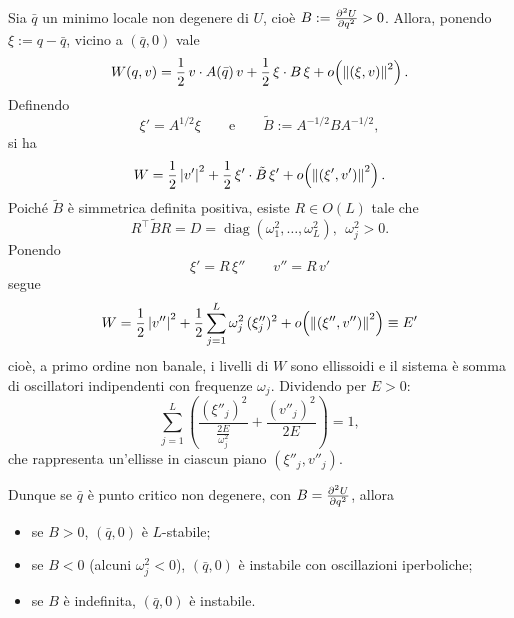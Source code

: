\begin{proposition}
Sia $\bar{q}$ un minimo locale non degenere di $U$, cioè $B:=\pdv[2]{U}{q}(\bar{q})>0$. Allora, ponendo $\xi:=q-\bar{q}$, vicino a $(\bar{q},0)$ vale
\begin{equation}
    W(q,v)=\frac{1}{2}\,v\cdot A(\bar{q})\,v+\frac{1}{2}\,\xi\cdot B\,\xi+o\!\left(\norm{(\xi,v)}^2\right).
\end{equation}
Definendo
\begin{equation}
    \xi'=A^{1/2}\xi \qquad\text{e}\qquad \tilde{B}:=A^{-1/2}BA^{-1/2},
\end{equation}
si ha
\begin{equation}
    W=\frac{1}{2}\,\abs{v'}^2+\frac{1}{2}\,\xi'\cdot \tilde{B}\,\xi'+o\!\left(\norm{(\xi',v')}^2\right).
\end{equation}
Poiché $\tilde{B}$ è simmetrica definita positiva, esiste $R\in O(L)$ tale che
\begin{equation}
    R^\intercal \tilde{B} R=D=\operatorname{diag}(\omega_1^2,\dots,\omega_L^2),\ \ \omega_j^2>0.
\end{equation}
Ponendo
\begin{equation}
    \xi'=R\,\xi'' \qquad v''=R\,v'
\end{equation}
segue
\begin{equation}
    W=\frac{1}{2}\,\abs{v''}^2+\frac{1}{2}\sum_{j=1}^{L}\omega_j^2\,(\xi''_j)^2+o\!\left(\norm{(\xi'',v'')}^2\right)\equiv E'
\end{equation}
cioè, a primo ordine non banale, i livelli di $W$ sono ellissoidi e il sistema è somma di oscillatori indipendenti con frequenze $\omega_j$.
Dividendo per $E>0$:
\begin{equation}
    \sum_{j=1}^{L}\left( \frac{(\xi''_j)^2}{\tfrac{2E}{\omega_j^2}} + \frac{(v''_j)^2}{2E} \right)=1,
\end{equation}
che rappresenta un’ellisse in ciascun piano $(\xi''_j,v''_j)$.


Dunque se $\bar{q}$ è punto critico non degenere, con $B=\pdv[2]{U}{q}(\bar{q})$, allora
\begin{itemize}
    \item se $B>0$, $(\bar{q},0)$ è $L$-stabile;
    \item se $B<0$ (alcuni $\omega_j^2<0$), $(\bar{q},0)$ è instabile con oscillazioni iperboliche;
    \item se $B$ è indefinita, $(\bar{q},0)$ è instabile.
\end{itemize}

\end{proposition}



